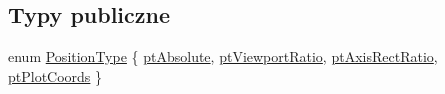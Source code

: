 \subsection*{Typy publiczne}
\begin{DoxyCompactItemize}
\item 
enum \hyperlink{class_q_c_p_item_position_aad9936c22bf43e3d358552f6e86dbdc8}{Position\+Type} \{ \hyperlink{class_q_c_p_item_position_aad9936c22bf43e3d358552f6e86dbdc8a564f5e53e550ead1ec5fc7fc7d0b73e0}{pt\+Absolute}, 
\hyperlink{class_q_c_p_item_position_aad9936c22bf43e3d358552f6e86dbdc8ac7d6aa89ceacb39658b0d6da061c789a}{pt\+Viewport\+Ratio}, 
\hyperlink{class_q_c_p_item_position_aad9936c22bf43e3d358552f6e86dbdc8a01080fd00eaf09fa238ef6b73bbfef75}{pt\+Axis\+Rect\+Ratio}, 
\hyperlink{class_q_c_p_item_position_aad9936c22bf43e3d358552f6e86dbdc8ad5ffb8dc99ad73263f7010c77342294c}{pt\+Plot\+Coords}
 \}
\end{DoxyCompactItemize}
